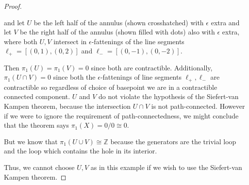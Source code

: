 \documentclass{article}
\begin{document}
\begin{enumerate}
\begin{proof}
		\begin{center}
                    \end{center}
                    
                    and let $U$ be the left half of the annulus (shown crosshatched) with $\epsilon$ extra and let $V$ be the right half of the annulus (shown filled with dots) also with $\epsilon$ extra, where both $U, V$ intersect in $\epsilon$-fattenings of the line segments $\ell_+ = [(0,1),(0,2)]$ and $\ell_-=[(0,-1),(0,-2)]$.
                    
                    Then $\pi_1(U) = \pi_1(V) = 0$ since both are contractible. Additionally, $\pi_1(U \cap V) =  0$ since both the $\epsilon$-fattenings of line segments $\ell_+, \ell_-$ are contractible so regardless of choice of basepoint we are in a contractible connected component. $U$ and $V$ do not violate the hypothesis of the Siefert-van Kampen theorem, because the intersection $U \cap V$ is not path-connected. However if we were to ignore the requirement of path-connectedness, we might conclude that the theorem says $\pi_1(X) = 0/0 \cong 0$.
                    
                    But we know that $\pi_1( U \cup V) \cong \mathbb{Z}$ because the generators are the trivial loop and the loop which contains the hole in its interior.
                    
                    Thus, we cannot choose $U,V$ as in this example if we wish to use the Siefert-van Kampen theorem.
	\end{proof}
	

\end{enumerate}
\end{document}
